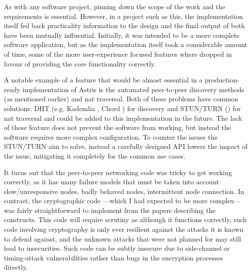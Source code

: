 As with any software project, pinning down the scope of the work and the requirements is essential. However, in a project such as this, the implementation itself fed back practicality information to the design and the final output of both have been mutually influential. Initially, it was intended to be a more complete software application, but as the implementation itself took a considerable amount of time, some of the more user-experience focused features where dropped in favour of providing the core functionality correctly.

A notable example of a feature that would be almost essential in a production-ready implementation of Astris is the automated peer-to-peer discovery methods (as mentioned earlier) and \gls{nat} traversal. Both of these problems have common solutions: DHT (e.g. Kademlia \cite{maymounkovKademliaPeertopeerInformation2002}, Chord \cite{ionstoicaChordScalablePeertopeer}) for discovery and STUN/TURN () for \gls{nat} traversal and could be added to this implementation in the future. The lack of these feature does not prevent the software from working, but instead the software requires more complex configuration. To counter the issues the STUN/TURN aim to solve, instead a carefully designed API lowers the impact of the issue, mitigating it completely for the common use cases.

It turns out that the peer-to-peer networking code was tricky to get working correctly, as it has many failure models that must be taken into account: slow/unresponsive nodes, badly behaved nodes, intermittent node connection. In contrast, the cryptographic code ---which I had expected to be more complex--- was fairly straightforward to implement from the papers  describing the constructs. This code will require scrutiny as although it functions correctly, such code involving cryptography is only ever resilient against the attacks it is known to defend against, and the unknown attacks that were not planned for may still lead to insecurities. Such code can be subtly insecure due to side-channel or timing-attack vulnerabilities rather than bugs in the encryption processes directly.
